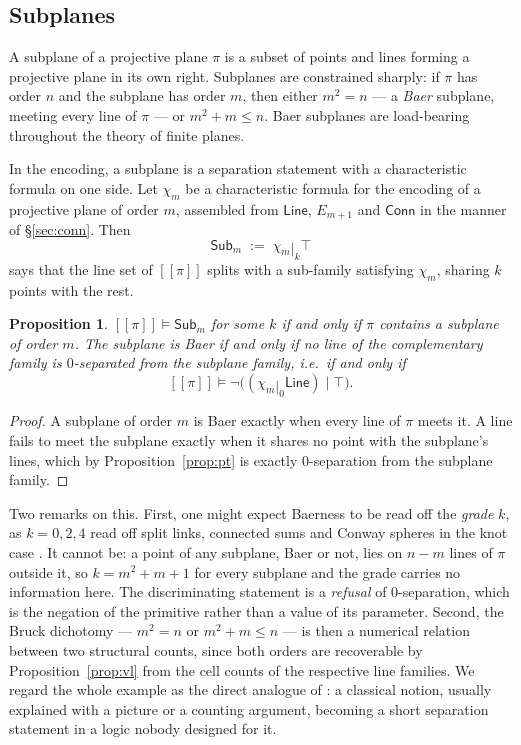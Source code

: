 \documentclass[11pt]{article}
\theoremstyle{plain}
\newtheorem{proposition}[theorem]{Proposition}
\theoremstyle{definition}
\newcommand{\enc}[1]{[\![#1]\!]}
\newcommand{\bmid}{\mathbin{|}}
\newcommand{\Line}{\mathsf{Line}}
\newcommand{\Sub}{\mathsf{Sub}}
\newcommand{\Conn}{\mathsf{Conn}}
\begin{document}
\subsection{Subplanes}

A subplane of a projective plane $\pi$ is a subset of points and lines forming a projective plane
in its own right. Subplanes are constrained sharply: if $\pi$ has order $n$ and the subplane has
order $m$, then either $m^2 = n$ --- a \emph{Baer} subplane, meeting every line of $\pi$ --- or
$m^2 + m \leq n$. Baer subplanes are load-bearing throughout the theory of finite planes.

In the encoding, a subplane is a separation statement with a characteristic formula on one side.
Let $\chi_m$ be a characteristic formula for the encoding of a projective plane of order $m$,
assembled from $\Line$, $E_{m+1}$ and $\Conn$ in the manner of \S\ref{sec:conn}. Then
\[
\Sub_m \;:=\; \chi_m \bmid_k \top
\]
says that the line set of $\enc{\pi}$ splits with a sub-family satisfying $\chi_m$, sharing $k$
points with the rest.

\begin{proposition}
\label{prop:baer}
$\enc{\pi} \models \Sub_m$ for some $k$ if and only if $\pi$ contains a subplane of order $m$.
The subplane is Baer if and only if no line of the complementary family is $0$-separated from the
subplane family, i.e.\ if and only if
\[
\enc{\pi} \models \neg\bigl( (\chi_m \bmid_0 \Line) \bmid \top \bigr).
\]
\end{proposition}

\begin{proof}
A subplane of order $m$ is Baer exactly when every line of $\pi$ meets it. A line fails to meet the
subplane exactly when it shares no point with the subplane's lines, which by
Proposition~\ref{prop:pt} is exactly $0$-separation from the subplane family.
\end{proof}

Two remarks on this. First, one might expect Baerness to be read off the \emph{grade} $k$, as
$k=0,2,4$ read off split links, connected sums and Conway spheres in the knot case
\cite[\S4.1]{Classifier}. It cannot be: a point of any subplane, Baer or not, lies on $n-m$ lines of
$\pi$ outside it, so $k = m^2+m+1$ for every subplane and the grade carries no information here.
The discriminating statement is a \emph{refusal} of $0$-separation, which is the negation of the
primitive rather than a value of its parameter. Second, the Bruck dichotomy --- $m^2 = n$ or
$m^2 + m \leq n$ --- is then a numerical relation between two structural counts, since both orders
are recoverable by Proposition~\ref{prop:vl} from the cell counts of the respective line families.
We regard the whole example as the direct analogue of \cite[\S4.2]{Classifier}: a classical notion,
usually explained with a picture or a counting argument, becoming a short separation statement in a
logic nobody designed for it.
\end{document}
